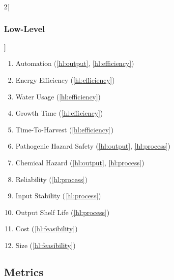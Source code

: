 \documentclass{../tex/report}
\begin{document}
\begin{multicols}{2}[\subsubsection{Low-Level}\label{sec:llos}]
\begin{enumerate}[label=LL\arabic*., ref=LL\arabic*]
        \item \label{ll:automation} Automation                              \hfill (\ref{hl:output}, \ref{hl:efficiency})
        \item \label{ll:efficiency_energy} Energy Efficiency                \hfill (\ref{hl:efficiency})
        \item \label{ll:efficiency_water} Water Usage                       \hfill (\ref{hl:efficiency})
        \item \label{ll:time_growth} Growth Time                            \hfill (\ref{hl:efficiency})
        \item \label{ll:time} Time-To-Harvest                               \hfill (\ref{hl:efficiency})
        \item \label{ll:safety_pathogen} Pathogenic Hazard Safety           \hfill (\ref{hl:output}, \ref{hl:process})
        \item \label{ll:safety_chemical} Chemical Hazard                    \hfill (\ref{hl:output}, \ref{hl:process})
        \item \label{ll:reliability} Reliability                            \hfill (\ref{hl:process})
        \item \label{ll:stability_input} Input Stability                    \hfill (\ref{hl:process})
        \item \label{ll:stability_output} Output Shelf Life                 \hfill (\ref{hl:process})
        \item \label{ll:cost} Cost                                          \hfill (\ref{hl:feasibility})
        \item \label{ll:size} Size                                          \hfill (\ref{hl:feasibility})
    \end{enumerate}
\end{multicols}

\clearpage
\subsection{Metrics}
\label{sec:metrics}
\end{document}
